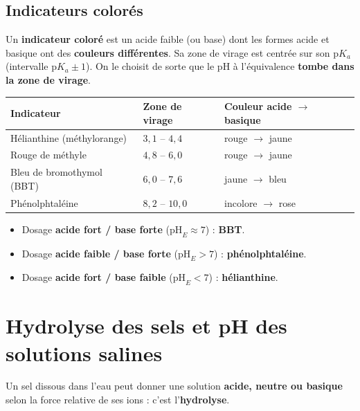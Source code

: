 \documentclass[11pt,a4paper]{article}
\begin{document}
\subsection{Indicateurs colorés}

\begin{definition}
Un \textbf{indicateur coloré} est un acide faible (ou base) dont les formes acide et basique ont des
\textbf{couleurs différentes}. Sa zone de virage est centrée sur son $\mathrm{p}K_a$ (intervalle
$\mathrm{p}K_a \pm 1$). On le choisit de sorte que le pH à l'équivalence \textbf{tombe dans la zone de virage}.
\end{definition}

\begin{center}
\begin{tabular}{lll}
\rowcolor{remarkcol!18}
\textbf{Indicateur} & \textbf{Zone de virage} & \textbf{Couleur acide $\to$ basique} \\
\midrule
Hélianthine (méthylorange) & $3{,}1$ -- $4{,}4$ & rouge $\to$ jaune \\
Rouge de méthyle & $4{,}8$ -- $6{,}0$ & rouge $\to$ jaune \\
Bleu de bromothymol (BBT)  & $6{,}0$ -- $7{,}6$ & jaune $\to$ bleu \\
Phénolphtaléine            & $8{,}2$ -- $10{,}0$ & incolore $\to$ rose \\
\bottomrule
\end{tabular}
\end{center}

\begin{regle}
\begin{itemize}[leftmargin=1.6em,topsep=2pt,itemsep=2pt]
  \item Dosage \textbf{acide fort / base forte} ($\mathrm{pH}_E \approx 7$) : \textbf{BBT}.
  \item Dosage \textbf{acide faible / base forte} ($\mathrm{pH}_E > 7$) : \textbf{phénolphtaléine}.
  \item Dosage \textbf{acide fort / base faible} ($\mathrm{pH}_E < 7$) : \textbf{hélianthine}.
\end{itemize}
\end{regle}

\section{Hydrolyse des sels et pH des solutions salines}
Un sel dissous dans l'eau peut donner une solution \textbf{acide, neutre ou basique} selon la force relative
de ses ions : c'est l'\textbf{hydrolyse}.
\end{document}
